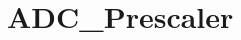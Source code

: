 \hypertarget{group___a_d_c___prescaler}{\section{A\-D\-C\-\_\-\-Prescaler}
\label{group___a_d_c___prescaler}
}
